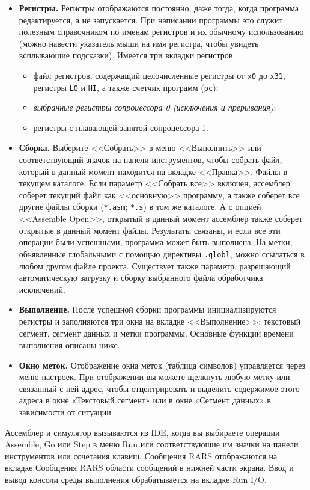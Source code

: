 \begin{itemize}
    \item \textbf{Регистры.} Регистры отображаются постоянно, даже тогда, когда программа редактируется, а не запускается. При написании программы это служит полезным справочником по именам регистров и их обычному использованию (можно навести указатель мыши на имя регистра, чтобы увидеть всплывающие подсказки). Имеется три вкладки регистров:
    \begin{itemize}
        \item файл регистров, содержащий целочисленные регистры от \verb|x0| до \verb|x31|, регистры \verb|LO| и \verb|HI|, а также счетчик программ (\verb|pc|);
        \item \textit{выбранные регистры сопроцессора 0 (исключения и прерывания)};
        \item регистры с плавающей запятой сопроцессора 1.
    \end{itemize}
    \item \textbf{Сборка.} Выберите <<Собрать>> в меню <<Выполнить>> или соответствующий значок на панели инструментов, чтобы собрать файл, который в данный момент находится на вкладке <<Правка>>. Файлы в текущем каталоге. Если параметр <<Собрать все>> включен, ассемблер соберет текущий файл как <<основную>> программу, а также соберет все другие файлы сборки (\verb|*.asm|; \verb|*.s|) в том же каталоге. А с опцией <<Assemble Open>>, открытый в данный момент ассемблер также соберет открытые в данный момент файлы. Результаты связаны, и если все эти операции были успешными, программа может быть выполнена. На метки, объявленные глобальными с помощью директивы \verb|.globl|, можно ссылаться в любом другом файле проекта. Существует также параметр, разрешающий автоматическую загрузку и сборку выбранного файла обработчика исключений.
    \item \textbf{Выполнение.} После успешной сборки программы инициализируются регистры и заполняются три окна на вкладке <<Выполнение>>: текстовый сегмент, сегмент данных и метки программы. Основные функции времени выполнения описаны ниже.
    \item \textbf{Окно меток.} Отображение окна меток (таблица символов) управляется через меню настроек. При отображении вы можете щелкнуть любую метку или связанный с ней адрес, чтобы отцентрировать и выделить содержимое этого адреса в окне «Текстовый сегмент» или в окне «Сегмент данных» в зависимости от ситуации.
\end{itemize}
    Ассемблер и симулятор вызываются из IDE, когда вы выбираете операции Assemble, Go или Step в меню Run или соответствующие им значки на панели инструментов или сочетания клавиш. Сообщения RARS отображаются на вкладке Сообщения RARS области сообщений в нижней части экрана. Ввод и вывод консоли среды выполнения обрабатывается на вкладке Run I/O.


